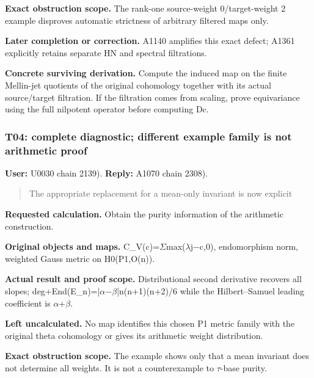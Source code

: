 \textbf{Exact obstruction scope.} The rank-one source-weight
0/target-weight 2 example disproves automatic strictness of arbitrary
filtered maps only.

\textbf{Later completion or correction.} A1140 amplifies this exact
defect; A1361 explicitly retains separate HN and spectral filtrations.

\textbf{Concrete surviving derivation.} Compute the induced map on the
finite Mellin-jet quotients of the original cohomology together with its
actual source/target filtration. If the filtration comes from scaling,
prove equivariance using the full nilpotent operator before computing
Dc.

\subsubsection{T04: complete diagnostic; different example family is not
arithmetic
proof}\label{TranscriptLedgerStage:t04-complete-diagnostic-different-example-family-is-not-arithmetic-proof}

\textbf{User:} U0030
\protect{} chain 2139).
\textbf{Reply:} A1070
\protect{} chain 2308).

\begin{quote}
The appropriate replacement for a mean-only invariant is now explicit
\end{quote}

\textbf{Requested calculation.} Obtain the purity information of the
arithmetic construction.

\textbf{Original objects and maps.}
C\_V(c)=\allowbreak{}\ensuremath{Σ}\allowbreak{}max(\allowbreak{}\ensuremath{λ}\allowbreak{}j\allowbreak{}\ensuremath{−}\allowbreak{}c,0),
endomorphism norm, weighted Gauss metric on H0(P1,O(n)).

\textbf{Actual result and proof scope.} Distributional second derivative
recovers all slopes;
deg+End(E\_n)=|\allowbreak{}\ensuremath{α}\allowbreak{}\allowbreak{}\ensuremath{−}\allowbreak{}\allowbreak{}\ensuremath{β}\allowbreak{}|n(n+1)(n+2)/6
while the Hilbert--Samuel leading coefficient is
\allowbreak{}\ensuremath{α}\allowbreak{}+\allowbreak{}\ensuremath{β}\allowbreak{}.

\textbf{Left uncalculated.} No map identifies this chosen P1 metric
family with the original theta cohomology or gives its arithmetic weight
distribution.

\textbf{Exact obstruction scope.} The example shows only that a mean
invariant does not determine all weights. It is not a counterexample to
\allowbreak{}\ensuremath{τ}\allowbreak{}-base purity.

